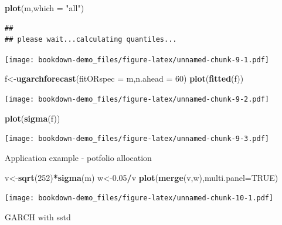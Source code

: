 \documentclass[
  12pt,
  a4paper,
  openany]{book}
\newenvironment{Shaded}{\begin{snugshade}}{\end{snugshade}}
\newcommand{\DataTypeTok}[1]{\textcolor[rgb]{0.13,0.29,0.53}{#1}}
\newcommand{\DecValTok}[1]{\textcolor[rgb]{0.00,0.00,0.81}{#1}}
\newcommand{\FloatTok}[1]{\textcolor[rgb]{0.00,0.00,0.81}{#1}}
\newcommand{\KeywordTok}[1]{\textcolor[rgb]{0.13,0.29,0.53}{\textbf{#1}}}
\newcommand{\NormalTok}[1]{#1}
\newcommand{\OperatorTok}[1]{\textcolor[rgb]{0.81,0.36,0.00}{\textbf{#1}}}
\newcommand{\OtherTok}[1]{\textcolor[rgb]{0.56,0.35,0.01}{#1}}
\newcommand{\StringTok}[1]{\textcolor[rgb]{0.31,0.60,0.02}{#1}}
\begin{document}
\begin{Shaded}
\begin{Highlighting}[]
\KeywordTok{plot}\NormalTok{(m,}\DataTypeTok{which =} \StringTok{"all"}\NormalTok{)}
\end{Highlighting}
\end{Shaded}

\begin{verbatim}
## 
## please wait...calculating quantiles...
\end{verbatim}

\texttt{[image: bookdown-demo\_files/figure-latex/unnamed-chunk-9-1.pdf]}

\begin{Shaded}
\begin{Highlighting}[]
\NormalTok{f\textless{}{-}}\KeywordTok{ugarchforecast}\NormalTok{(}\DataTypeTok{fitORspec =}\NormalTok{ m,}\DataTypeTok{n.ahead =} \DecValTok{60}\NormalTok{)}
\KeywordTok{plot}\NormalTok{(}\KeywordTok{fitted}\NormalTok{(f))}
\end{Highlighting}
\end{Shaded}

\texttt{[image: bookdown-demo\_files/figure-latex/unnamed-chunk-9-2.pdf]}

\begin{Shaded}
\begin{Highlighting}[]
\KeywordTok{plot}\NormalTok{(}\KeywordTok{sigma}\NormalTok{(f))}
\end{Highlighting}
\end{Shaded}

\texttt{[image: bookdown-demo\_files/figure-latex/unnamed-chunk-9-3.pdf]}

Application example - potfolio allocation

\begin{Shaded}
\begin{Highlighting}[]
\NormalTok{v\textless{}{-}}\KeywordTok{sqrt}\NormalTok{(}\DecValTok{252}\NormalTok{)}\OperatorTok{*}\KeywordTok{sigma}\NormalTok{(m)}
\NormalTok{w\textless{}{-}}\FloatTok{0.05}\OperatorTok{/}\NormalTok{v}
\KeywordTok{plot}\NormalTok{(}\KeywordTok{merge}\NormalTok{(v,w),}\DataTypeTok{multi.panel=}\OtherTok{TRUE}\NormalTok{)}
\end{Highlighting}
\end{Shaded}

\texttt{[image: bookdown-demo\_files/figure-latex/unnamed-chunk-10-1.pdf]}

GARCH with sstd
\end{document}
